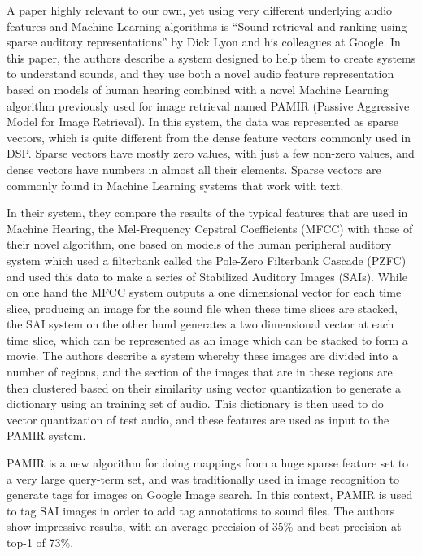 A paper highly relevant to our own, yet using very different
underlying audio features and Machine Learning algorithms is ``Sound
retrieval and ranking using sparse auditory representations''
\cite{lyon10} by Dick Lyon and his colleagues at Google.  In this
paper, the authors describe a system designed to help them to create
systems to understand sounds, and they use both a novel audio feature
representation based on models of human hearing combined with a novel
Machine Learning algorithm previously used for image retrieval named
PAMIR (Passive Aggressive Model for Image Retrieval).  In this system,
the data was represented as sparse vectors, which is quite different
from the dense feature vectors commonly used in DSP.  Sparse vectors
have mostly zero values, with just a few non-zero values, and dense
vectors have numbers in almost all their elements.  Sparse vectors are
commonly found in Machine Learning systems that work with text.

In their system, they compare the results of the typical features that
are used in Machine Hearing, the Mel-Frequency Cepstral Coefficients
\cite{Logan00melfrequency} (MFCC) with those of their novel algorithm,
one based on models of the human peripheral auditory system which used
a filterbank called the Pole-Zero Filterbank Cascade (PZFC) and used
this data to make a series of Stabilized Auditory Images (SAIs).
While on one hand the MFCC system outputs a one dimensional vector for
each time slice, producing an image for the sound file when these time
slices are stacked, the SAI system on the other hand generates a two
dimensional vector at each time slice, which can be represented as an
image which can be stacked to form a movie.  The authors describe a
system whereby these images are divided into a number of regions, and
the section of the images that are in these regions are then clustered
based on their similarity using vector quantization to generate a
dictionary using an training set of audio.  This dictionary is then
used to do vector quantization of test audio, and these features are
used as input to the PAMIR system.

PAMIR is a new algorithm for doing mappings from a huge sparse feature
set to a very large query-term set, and was traditionally used in
image recognition \cite{chechik10} to generate tags for images on
Google Image search.  In this context, PAMIR is used to tag SAI images
in order to add tag annotations to sound files.  The authors show
impressive results, with an average precision of 35\% and best
precision at top-1 of 73\%.

